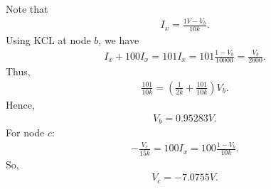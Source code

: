 \documentclass{report}
\begin{document}
\begin{itemize}
            \bigbreak \noindent 
            Note that
            \begin{align*}
                I_{x} = \frac{1V - V_{b}}{10k}
            .\end{align*}
            Using KCL at node $b$, we have
            \begin{align*}
                I_{x} + 100I_{x} = 101I_{x} = 101 \frac{1-V_{b}}{10000} = \frac{V_{b}}{2000}
            .\end{align*}
            Thus,
            \begin{align*}
                \frac{101}{10k} = \left(\frac{1}{2k} + \frac{101}{10k}\right)V_{b}
            .\end{align*}
            Hence,
            \begin{align*}
                V_{b} = 0.95283V
            .\end{align*}
            For node $c$:
            \begin{align*}
                -\frac{V_{c}}{15k} = 100I_{x} = 100 \frac{1-V_{b}}{10k}
            .\end{align*}
            So,
            \begin{align*}
                V_{c} = -7.0755V
            .\end{align*}


    \end{itemize}
\end{document}
